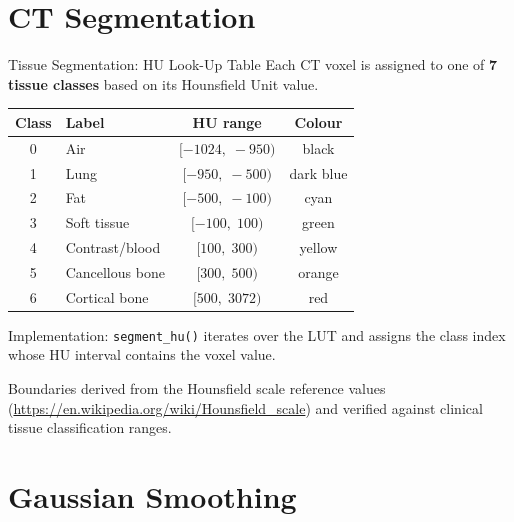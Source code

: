 \documentclass[aspectratio=169, 10pt]{beamer}
\begin{document}
\section{CT Segmentation}

\begin{frame}{Tissue Segmentation: HU Look-Up Table}
  Each CT voxel is assigned to one of \textbf{7 tissue classes} based on its
  Hounsfield Unit value.

  \vspace{6pt}
  \begin{center}
    \begin{tabular}{clcc}
      \toprule
      \textbf{Class} & \textbf{Label} & \textbf{HU range} & \textbf{Colour} \\
      \midrule
      0 & Air            & $[-1024,\; -950)$ & black \\
      1 & Lung           & $[-950,\; -500)$  & dark blue \\
      2 & Fat            & $[-500,\; -100)$  & cyan \\
      3 & Soft tissue    & $[-100,\; 100)$   & green \\
      4 & Contrast/blood & $[100,\; 300)$    & yellow \\
      5 & Cancellous bone& $[300,\; 500)$    & orange \\
      6 & Cortical bone  & $[500,\; 3072)$   & red \\
      \bottomrule
    \end{tabular}
  \end{center}

  \vspace{6pt}
  Implementation: \texttt{segment\_hu()} iterates over the LUT and assigns
  the class index whose HU interval contains the voxel value.

  \vspace{4pt}
  {\small Boundaries derived from the Hounsfield scale reference values
  (\url{https://en.wikipedia.org/wiki/Hounsfield_scale}) and verified
  against clinical tissue classification ranges.}
\end{frame}

\section{Gaussian Smoothing}
\end{document}
